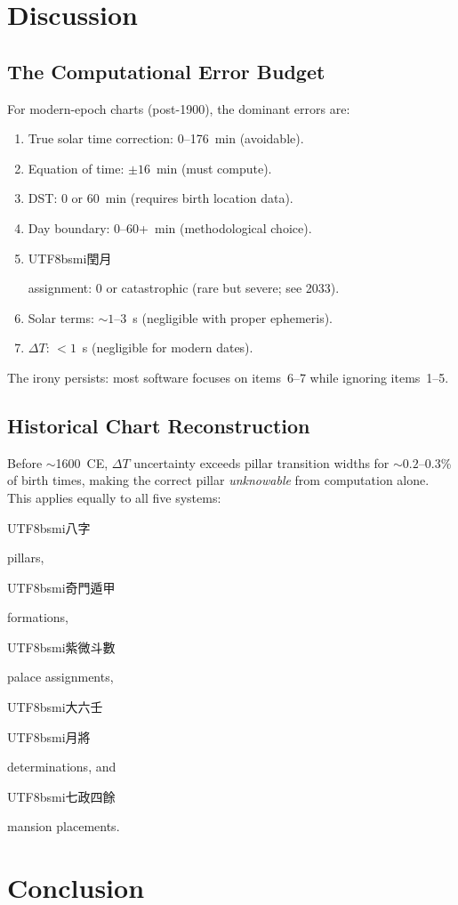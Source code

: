 \documentclass[10pt,a4paper]{article}
\newcommand{\zh}[1]{\begin{CJK}{UTF8}{bsmi}#1\end{CJK}}
\begin{document}
\section{Discussion}
\label{sec:discussion}

\subsection{The Computational Error Budget}

For modern-epoch charts (post-1900), the dominant errors are:

\begin{enumerate}
  \item True solar time correction: 0--176~min (avoidable).
  \item Equation of time: $\pm 16$~min (must compute).
  \item DST: 0 or 60~min (requires birth location data).
  \item Day boundary: 0--60+~min (methodological choice).
  \item \zh{閏月} assignment: 0 or catastrophic (rare but severe; see 2033).
  \item Solar terms: $\sim 1$--$3$~s (negligible with proper ephemeris).
  \item $\Delta T$: $< 1$~s (negligible for modern dates).
\end{enumerate}

The irony persists: most software focuses on items~6--7 while ignoring
items~1--5.

\subsection{Historical Chart Reconstruction}

Before $\sim$1600~CE, $\Delta T$ uncertainty exceeds pillar transition
widths for $\sim 0.2$--$0.3$\% of birth times, making the correct pillar
\emph{unknowable} from computation alone. This applies equally to all five
systems: \zh{八字} pillars, \zh{奇門遁甲} formations, \zh{紫微斗數}
palace assignments, \zh{大六壬} \zh{月將} determinations, and
\zh{七政四餘} mansion placements.


\section{Conclusion}
\label{sec:conclusion}
\end{document}
